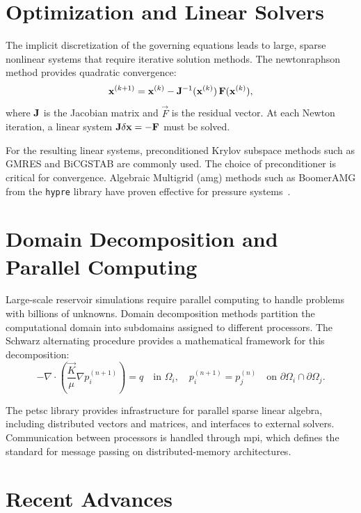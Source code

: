 \section{Optimization and Linear Solvers}
\label{sec:background:solvers}

The implicit discretization of the governing equations leads to large, sparse nonlinear systems that require iterative solution methods. The \gls{newtonraphson} method provides quadratic convergence:
\begin{equation}
    \mathbf{x}^{(k+1)} = \mathbf{x}^{(k)} - \mathbf{J}^{-1}(\mathbf{x}^{(k)}) \, \mathbf{F}(\mathbf{x}^{(k)}),
    \label{eq:newton}
\end{equation}
where $\mathbf{J}$ is the Jacobian matrix and $\vec{F}$ is the residual vector. At each Newton iteration, a linear system $\mathbf{J} \delta \mathbf{x} = -\mathbf{F}$ must be solved.

For the resulting linear systems, preconditioned Krylov subspace methods such as GMRES and BiCGSTAB are commonly used. The choice of preconditioner is critical for convergence. Algebraic Multigrid (\gls{amg}) methods such as BoomerAMG from the \texttt{hypre} library have proven effective for pressure systems~\cite{PTBSI}.

\section{Domain Decomposition and Parallel Computing}
\label{sec:background:parallel}

Large-scale reservoir simulations require parallel computing to handle problems with billions of unknowns. Domain decomposition methods partition the computational domain into subdomains assigned to different processors. The Schwarz alternating procedure provides a mathematical framework for this decomposition:
\begin{equation}
    -\nabla \cdot \left( \frac{\vec{K}}{\mu} \nabla p^{(n+1)}_i \right) = q \quad \text{in } \Omega_i, \quad p^{(n+1)}_i = p^{(n)}_j \quad \text{on } \partial \Omega_i \cap \partial \Omega_j.
    \label{eq:schwarz}
\end{equation}

The \gls{petsc} library provides infrastructure for parallel sparse linear algebra, including distributed vectors and matrices, and interfaces to external solvers. Communication between processors is handled through \gls{mpi}, which defines the standard for message passing on distributed-memory architectures.

\section{Recent Advances}
\label{sec:background:recent}

